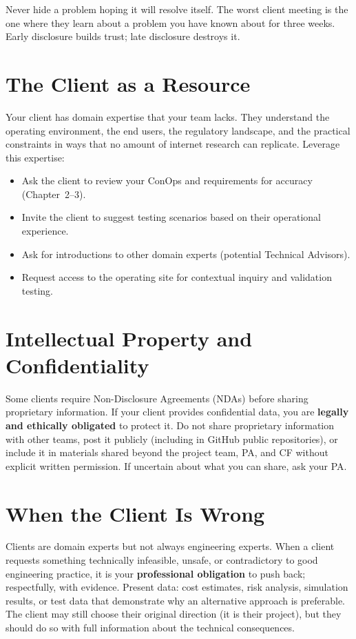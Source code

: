 Never hide a problem hoping it will resolve itself. The worst client meeting is the one where they learn about a problem you have known about for three weeks. Early disclosure builds trust; late disclosure destroys it.

\section{The Client as a Resource}
Your client has domain expertise that your team lacks. They understand the operating environment, the end users, the regulatory landscape, and the practical constraints in ways that no amount of internet research can replicate. Leverage this expertise:

\begin{itemize}[nosep,leftmargin=1.5em]
\item Ask the client to review your ConOps and requirements for accuracy (Chapter~2--3).
\item Invite the client to suggest testing scenarios based on their operational experience.
\item Ask for introductions to other domain experts (potential Technical Advisors).
\item Request access to the operating site for contextual inquiry and validation testing.
\end{itemize}

\section{Intellectual Property and Confidentiality}
Some clients require Non-Disclosure Agreements (NDAs) before sharing proprietary information. If your client provides confidential data, you are \textbf{legally and ethically obligated} to protect it. Do not share proprietary information with other teams, post it publicly (including in GitHub public repositories), or include it in materials shared beyond the project team, PA, and CF without explicit written permission. If uncertain about what you can share, ask your PA.

\section{When the Client Is Wrong}
Clients are domain experts but not always engineering experts. When a client requests something technically infeasible, unsafe, or contradictory to good engineering practice, it is your \textbf{professional obligation} to push back; respectfully, with evidence. Present data: cost estimates, risk analysis, simulation results, or test data that demonstrate why an alternative approach is preferable. The client may still choose their original direction (it is their project), but they should do so with full information about the technical consequences.

